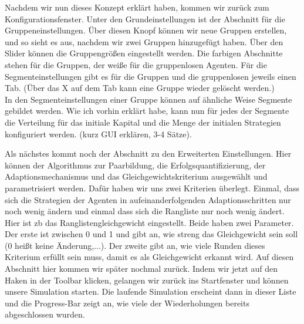 \documentclass[parskip=full,11pt]{scrartcl}
\begin{document}
Nachdem wir nun dieses Konzept erklärt haben, kommen wir zurück zum Konfigurationsfenster. Unter den Grundeinstellungen ist der Abschnitt für die Gruppeneinstellungen. Über diesen Knopf können wir neue Gruppen erstellen, und so sieht es aus, nachdem wir zwei Gruppen hinzugefügt haben. Über den Slider können die Gruppengrößen eingestellt werden. Die farbigen Abschnitte stehen für die Gruppen, der weiße für die gruppenlosen Agenten. Für die Segmenteinstellungen gibt es für die Gruppen und die gruppenlosen jeweils einen Tab. (Über das X auf dem Tab kann eine Gruppe wieder gelöscht werden.)\\
In den Segmenteinstellungen einer Gruppe können auf ähnliche Weise Segmente gebildet werden. Wie ich vorhin erklärt habe, kann nun für jedes der Segmente die Verteilung für das initiale Kapital und die Menge der initialen Strategien konfiguriert werden. (kurz GUI erklären, 3-4 Sätze).

Als nächstes kommt noch der Abschnitt zu den Erweiterten Einstellungen. Hier können der Algorithmus zur Paarbildung, die Erfolgsquantifizierung, der Adaptionsmechanismus und das Gleichgewichtskriterium ausgewählt und parametrisiert werden. Dafür haben wir uns zwei Kriterien überlegt. Einmal, dass sich die Strategien der Agenten in aufeinanderfolgenden Adaptionsschritten nur noch wenig ändern und einmal dass sich die Rangliste nur noch wenig ändert. Hier ist zb das Ranglistengleichgewicht eingestellt. Beide haben zwei Parameter. Der erste ist zwischen 0 und 1 und gibt an, wie streng das Gleichgewicht sein soll (0 heißt keine Änderung,...). Der zweite gibt an, wie viele Runden dieses Kriterium erfüllt sein muss, damit es als Gleichgewicht erkannt wird. Auf diesen Abschnitt hier kommen wir später nochmal zurück. Indem wir jetzt auf den Haken in der Toolbar klicken, gelangen wir zurück ins Startfenster und können unsere Simulation starten. Die laufende Simulation erscheint dann in dieser Liste und die Progress-Bar zeigt an, wie viele der Wiederholungen bereits abgeschlossen wurden.
\end{document}
